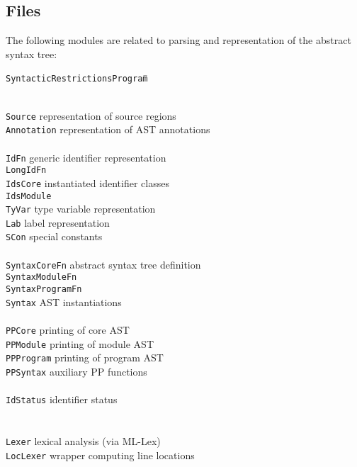 \documentclass[twoside,titlepage]{article}
\begin{document}
\subsection{Files}
\label{parsingfiles}

The following modules are related to parsing and representation of the abstract syntax tree:

\begin{quoting}
\begin{tabbing}
{\tt SyntacticRestrictionsProgram}\qquad \= \kill

\hspace{-1em}{\tt syntax/} \\
{\tt Source}		\> representation of source regions \\
{\tt Annotation}		\> representation of AST annotations \\
\\
{\tt IdFn}		\> generic identifier representation \\
{\tt LongIdFn}		\> \\
{\tt IdsCore}		\> instantiated identifier classes \\
{\tt IdsModule}		\> \\
{\tt TyVar}		\> type variable representation \\
{\tt Lab}		\> label representation \\
{\tt SCon}		\> special constants \\
\\
{\tt SyntaxCoreFn}	\> abstract syntax tree definition \\
{\tt SyntaxModuleFn}	\> \\
{\tt SyntaxProgramFn}	\> \\
{\tt Syntax}		\> AST instantiations \\
\\
{\tt PPCore}		\> printing of core AST \\
{\tt PPModule}		\> printing of module AST \\
{\tt PPProgram}		\> printing of program AST \\
{\tt PPSyntax}		\> auxiliary PP functions \\
\\
{\tt IdStatus}		\> identifier status \\
\\
\hspace{-1em}{\tt parse/} \\
{\tt Lexer}		\> lexical analysis (via ML-Lex) \\
{\tt LocLexer}	\> wrapper computing line locations \\

\end{tabbing}
\end{quoting}
\end{document}
